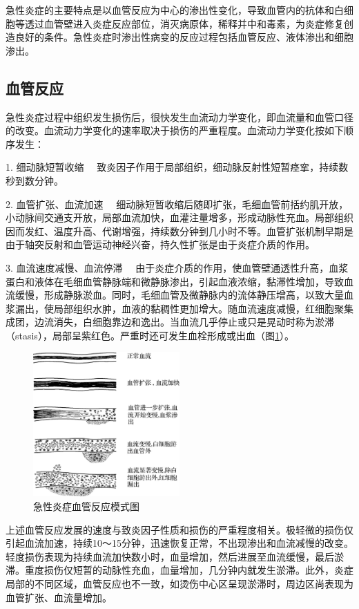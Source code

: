 急性炎症的主要特点是以血管反应为中心的渗出性变化，导致血管内的抗体和白细胞等透过血管壁进入炎症反应部位，消灭病原体，稀释并中和毒素，为炎症修复创造良好的条件。急性炎症时渗出性病变的反应过程包括血管反应、液体渗出和细胞渗出。

\subsection{血管反应}

急性炎症过程中组织发生损伤后，很快发生血流动力学变化，即血流量和血管口径的改变。血流动力学变化的速率取决于损伤的严重程度。血流动力学变化按如下顺序发生：

{1. 细动脉短暂收缩}
　致炎因子作用于局部组织，细动脉反射性短暂痉挛，持续数秒到数分钟。

{2. 血管扩张、血流加速}
　细动脉短暂收缩后随即扩张，毛细血管前括约肌开放，小动脉间交通支开放，局部血流加快，血灌注量增多，形成动脉性充血。局部组织因而发红、温度升高、代谢增强，持续数分钟到几小时不等。血管扩张机制早期是由于轴突反射和血管运动神经兴奋，持久性扩张是由于炎症介质的作用。

{3. 血流速度减慢、血流停滞}
　由于炎症介质的作用，使血管壁通透性升高，血浆蛋白和液体在毛细血管静脉端和微静脉渗出，引起血液浓缩，黏滞性增加，导致血流缓慢，形成静脉淤血。同时，毛细血管及微静脉内的流体静压增高，以致大量血浆漏出，使局部组织水肿，血液的黏稠性更加增大。随血流速度减慢，红细胞聚集成团，边流消失，白细胞靠边和逸出。当血流几乎停止或只是晃动时称为淤滞（stasis），局部呈紫红色。严重时还可发生血栓形成或出血（图\ref{fig4-1}）。

\begin{figure}[!htbp]
 \centering
 \includegraphics[width=0.5\textwidth]{./images/Image00050.jpg}
 \caption{急性炎症血管反应模式图}
 \label{fig4-1}
\end{figure} 

上述血管反应发展的速度与致炎因子性质和损伤的严重程度相关。极轻微的损伤仅引起血流加速，持续10～15分钟，迅速恢复正常，不出现渗出和血流减慢的改变。轻度损伤表现为持续血流加快数小时，血量增加，然后进展至血流缓慢，最后淤滞。重度损伤仅短暂的动脉性充血，血量增加，几分钟内就发生淤滞。此外，炎症局部的不同区域，血管反应也不一致，如烫伤中心区呈现淤滞时，周边区尚表现为血管扩张、血流量增加。

